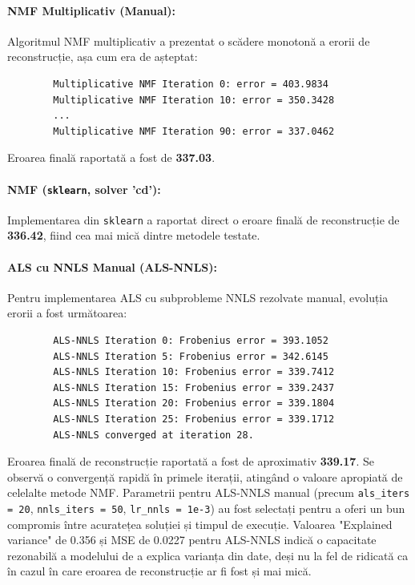 \documentclass[12pt,a4paper]{article}
\begin{document}
	\paragraph{NMF Multiplicativ (Manual):}
	Algoritmul NMF multiplicativ a prezentat o scădere monotonă a erorii de reconstrucție, așa cum era de așteptat:
	\begin{verbatim}
		Multiplicative NMF Iteration 0: error = 403.9834
		Multiplicative NMF Iteration 10: error = 350.3428
		...
		Multiplicative NMF Iteration 90: error = 337.0462
	\end{verbatim}
	Eroarea finală raportată a fost de \textbf{337.03}.

	\paragraph{NMF (\texttt{sklearn}, solver 'cd'):}
	Implementarea din \texttt{sklearn} a raportat direct o eroare finală de reconstrucție de \textbf{336.42}, fiind cea mai mică dintre metodele testate.

	\paragraph{ALS cu NNLS Manual (ALS-NNLS):}
	Pentru implementarea ALS cu subprobleme NNLS rezolvate manual, evoluția erorii a fost următoarea:
	\begin{verbatim}
		ALS-NNLS Iteration 0: Frobenius error = 393.1052
		ALS-NNLS Iteration 5: Frobenius error = 342.6145
		ALS-NNLS Iteration 10: Frobenius error = 339.7412
		ALS-NNLS Iteration 15: Frobenius error = 339.2437
		ALS-NNLS Iteration 20: Frobenius error = 339.1804
		ALS-NNLS Iteration 25: Frobenius error = 339.1712
		ALS-NNLS converged at iteration 28.
	\end{verbatim}
	Eroarea finală de reconstrucție raportată a fost de aproximativ \textbf{339.17}. Se observă o convergență rapidă în primele iterații, atingând o valoare apropiată de celelalte metode NMF. Parametrii pentru ALS-NNLS manual (precum \texttt{als\_iters = 20}, \texttt{nnls\_iters = 50}, \texttt{lr\_nnls = 1e-3}) au fost selectați pentru a oferi un bun compromis între acuratețea soluției și timpul de execuție. Valoarea "Explained variance" de 0.356 și MSE de 0.0227 pentru ALS-NNLS indică o capacitate rezonabilă a modelului de a explica varianța din date, deși nu la fel de ridicată ca în cazul în care eroarea de reconstrucție ar fi fost și mai mică.
\end{document}
